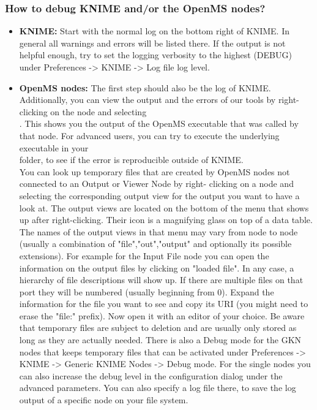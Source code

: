 \subsubsection{How to debug KNIME and/or the OpenMS nodes?}
\begin{itemize}
\item \textbf{KNIME:} Start with the normal log on the bottom right of KNIME. In general all warnings and errors will be
listed there. If the output is not helpful enough, try to set the logging verbosity to the highest (DEBUG) under
Preferences -> KNIME -> Log file log level.
\item \textbf{OpenMS nodes:} The first step should also be the log of KNIME. Additionally, you can view the output and the errors of our
tools by right-clicking on the node and selecting\\
. This shows you the output of the OpenMS executable that was called by that 
node. For advanced users, you can try 
to execute the underlying executable in your\\
 folder, 
to see if the error is reproducible outside of KNIME.\\
You can look up temporary files that are created by OpenMS nodes not connected to an Output or Viewer Node by right-
clicking on a node and selecting the corresponding output view for the output you want to have a look at. The output 
views are located on the bottom of the menu that shows up after right-clicking. Their icon is a magnifying glass on 
top of a data table. The names of the output views in that menu may vary from node to node (usually a combination of 
"file","out","output" and optionally its possible extensions). For example for the Input File node you can open the 
information on the output files by clicking on "loaded file". In any case, a hierarchy of file descriptions will show 
up. If there are multiple files on that port they will be numbered (usually beginning from 0). Expand the information 
for the file you want to see and copy its URI (you might need to erase the "file:" prefix). Now open it with an 
editor of your choice. Be aware that temporary files are subject to deletion and are usually only stored as long as 
they are actually needed. There is also a Debug mode for the GKN nodes that keeps temporary files that can be activated
under Preferences -> KNIME -> Generic KNIME Nodes -> Debug mode.
For the single nodes you can also increase the debug level in the configuration dialog under the advanced parameters.
You can also specify a log file there, to save the log output of a specific node on your file system.
\end{itemize}

